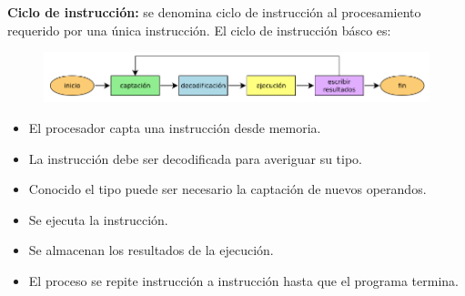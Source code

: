 \documentclass{article}
\begin{document}
\textbf{Ciclo de instrucción:} se denomina ciclo de instrucción al procesamiento requerido por una única instrucción. El ciclo de instrucción básco es:

\begin{figure}[h]
\centering
\includegraphics[scale=1,width=\textwidth]{ciclo_instruccion.png}
\end{figure}

\begin{itemize}
\item El procesador capta una instrucción desde memoria.

\item La instrucción debe ser decodificada para averiguar su tipo.

\item Conocido el tipo puede ser necesario la captación de nuevos operandos.

\item Se ejecuta la instrucción.

\item Se almacenan los resultados de la ejecución.

\item El proceso se repite instrucción a instrucción hasta que el programa termina.
\end{itemize}
\end{document}
